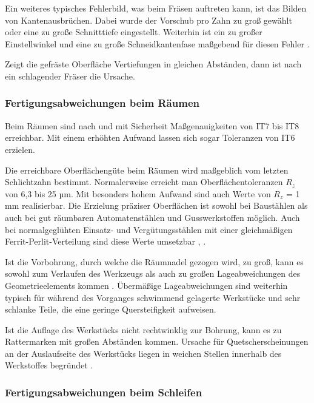 Ein weiteres typisches Fehlerbild, was beim Fräsen auftreten kann, ist das Bilden von Kantenausbrüchen. Dabei wurde der Vorschub pro Zahn zu groß gewählt oder eine zu große Schnitttiefe eingestellt. Weiterhin ist ein zu großer Einstellwinkel und eine zu große Schneidkantenfase maßgebend für diesen Fehler \cite{Winkler.1990}.

Zeigt die gefräste Oberfläche Vertiefungen in gleichen Abständen, dann ist nach \cite{Dietrich.2014} ein schlagender Fräser die Ursache. 

\subsubsection{Fertigungsabweichungen beim Räumen}

Beim Räumen sind nach \cite{Dietrich.2014} und \cite{Denkena.2011} mit Sicherheit Maßgenauigkeiten von IT7 bis IT8 erreichbar. Mit einem erhöhten Aufwand lassen sich sogar Toleranzen von IT6 erzielen.

Die erreichbare Oberflächengüte beim Räumen wird maßgeblich vom letzten Schlichtzahn bestimmt.
Normalerweise erreicht man Oberflächentoleranzen $R_{z}$ von 6,3 bis 25 µm. Mit besonders hohem Aufwand sind auch Werte von $R_{z}$ = 1 mm realisierbar. Die Erzielung präziser Oberflächen ist sowohl bei Baustählen als auch bei gut räumbaren Automatenstählen und Gusswerkstoffen möglich. Auch bei normalgeglühten Einsatz- und Vergütungsstählen mit einer gleichmäßigen Ferrit-Perlit-Verteilung sind diese Werte umsetzbar \cite{Dietrich.2014}, \cite{Meyer.2013}.       

Ist die Vorbohrung, durch welche die Räumnadel gezogen wird, zu groß, kann es sowohl zum Verlaufen des Werkzeugs als auch zu großen Lageabweichungen des Geometrieelements kommen \cite{Denkena.2011}.
Übermäßige Lageabweichungen sind weiterhin typisch für während des Vorganges schwimmend gelagerte Werkstücke und sehr schlanke Teile, die eine geringe Quersteifigkeit aufweisen. 

Ist die Auflage des Werkstücks nicht rechtwinklig zur Bohrung, kann es zu Rattermarken mit großen Abständen kommen. 
Ursache für Quetscherscheinungen an der Auslaufseite des Werkstücks liegen in weichen Stellen innerhalb des Werkstoffes begründet \cite{Dietrich.2014}.    

\subsubsection{Fertigungsabweichungen beim Schleifen}

